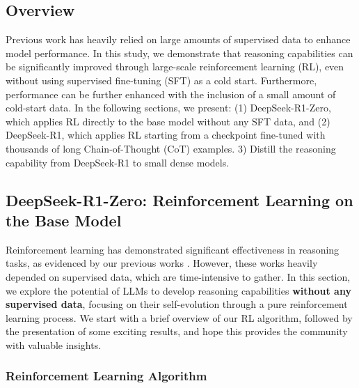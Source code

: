 \documentclass[11pt, a4paper, logo, copyright, nonumbering]{deepseek}
\newcommand{\dsri}{DeepSeek-R1}
\newcommand{\dsro}{DeepSeek-R1-Zero}
\begin{document}
\subsection{Overview}
Previous work has heavily relied on large amounts of supervised data to enhance model performance. In this study, we demonstrate that reasoning capabilities can be significantly improved through large-scale reinforcement learning (RL), even without using supervised fine-tuning (SFT) as a cold start. Furthermore, performance can be further enhanced with the inclusion of a small amount of cold-start data. In the following sections, we present: (1) \dsro{}, which applies RL directly to the base model without any SFT data, and (2) \dsri{}, which applies RL starting from a checkpoint fine-tuned with thousands of long Chain-of-Thought (CoT) examples. 3) Distill the reasoning capability from \dsri{} to small dense models. 


\subsection{ \dsro{}: Reinforcement Learning on the Base Model}
\label{sec:ds-zero}
Reinforcement learning has demonstrated significant effectiveness in reasoning tasks, as evidenced by our previous works \citep{mathshepherd,deepseekmath}. 
However, these works heavily depended on supervised data, which are time-intensive to gather.
In this section, we explore the potential of LLMs to develop reasoning capabilities \textbf{without any supervised data}, focusing on their self-evolution through a pure reinforcement learning process. 
We start with a brief overview of our RL algorithm, followed by the presentation of some exciting results, and hope this provides the community with valuable insights.

\subsubsection{Reinforcement Learning Algorithm}
\end{document}
